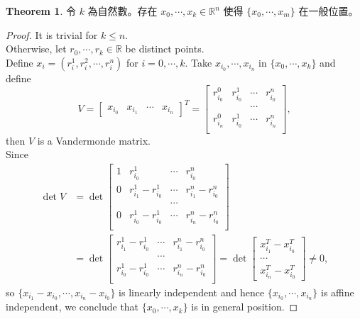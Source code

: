 \documentclass[12pt]{article}
\theoremstyle{definition}
\newtheorem{theorem}[definition]{Theorem}
\newcommand\<{\langle}
\renewcommand\>{\rangle}
\begin{document}
\begin{CJK}{UTF8}{bsmi}
\begin{theorem}
    令 $k$ 為自然數。存在 $x_0, \cdots, x_k\in\mathbb{R}^n$ 使得 $\{x_0, \cdots, x_m\}$ 在一般位置。
\end{theorem}
\begin{proof}
    It is trivial for $k\le n$. \\
    Otherwise, let $r_0, \cdots, r_k\in\mathbb{R}$ be distinct points. \\
    Define $x_i=(r_i^1, r_i^2, \cdots, r_i^n)$ for $i=0, \cdots, k$.
    Take $x_{i_0}, \cdots, x_{i_n}$ in $\{x_0, \cdots, x_k\}$ and define
    \[
        V =
        \begin{bmatrix}
            x_{i_0} & x_{i_1} & \cdots & x_{i_n}
        \end{bmatrix}^T
        =
        \begin{bmatrix}
            r_{i_0}^0 & r_{i_0}^1 & \cdots & r_{i_0}^n \\
            & & \cdots \\
            r_{i_n}^0 & r_{i_0}^1 & \cdots & r_{i_n}^n \\
        \end{bmatrix},
    \]
    then $V$ is a Vandermonde matrix. \\
    Since
    \begin{align*}
        \det V 
        & = \det
        \begin{bmatrix}
            1 & r_{i_0}^1 & \cdots & r_{i_0}^n \\
            0 & r_{i_1}^1-r_{i_0}^1 & \cdots & r_{i_1}^n-r_{i_0}^n \\
            & & \cdots \\
            0 & r_{i_0}^1-r_{i_0}^1 & \cdots & r_{i_n}^n-r_{i_0}^n \\
        \end{bmatrix} \\
        & = \det
        \begin{bmatrix}
            r_{i_1}^1-r_{i_0}^1 & \cdots & r_{i_1}^n-r_{i_0}^n \\
            & \cdots \\
            r_{i_0}^1-r_{i_0}^1 & \cdots & r_{i_n}^n-r_{i_0}^n \\
        \end{bmatrix}
         = \det
        \begin{bmatrix}
            x_{i_1}^T-x_{i_0}^T \\
            \cdots \\
            x_{i_n}^T-x_{i_0}^T
        \end{bmatrix}
        \ne 0,
    \end{align*}
    so $\{x_{i_1}-x_{i_0}, \cdots, x_{i_n}-x_{i_0}\}$ is linearly independent and hence $\{x_{i_0}, \cdots, x_{i_n}\}$ is affine independent, we conclude that $\{x_0, \cdots, x_k\}$ is in general position.
\end{proof}


\end{CJK}
\end{document}
